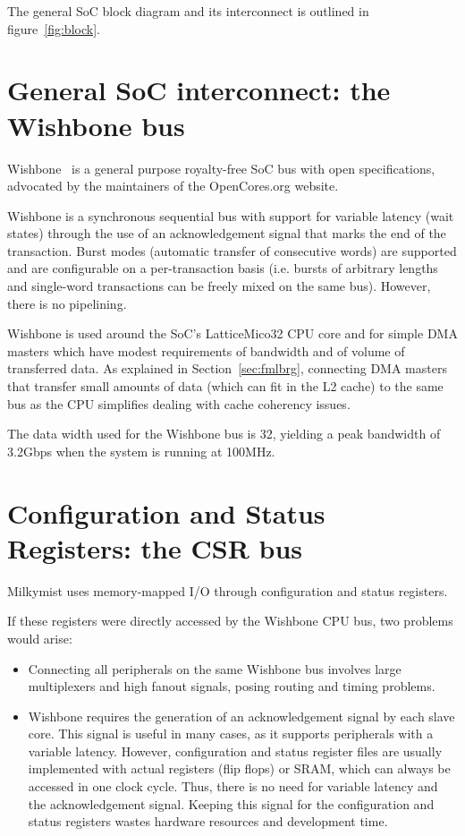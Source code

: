 \documentclass[a4paper,11pt]{kthesis}
\begin{document}
The general SoC block diagram and its interconnect is outlined in figure~\ref{fig:block}.

\section{General SoC interconnect: the Wishbone bus}
Wishbone~\cite{wishbone} is a general purpose royalty-free SoC bus with open specifications, advocated by the maintainers of the OpenCores.org website.

Wishbone is a synchronous sequential bus with support for variable latency (wait states) through the use of an acknowledgement signal that marks the end of the transaction. Burst modes (automatic transfer of consecutive words) are supported and are configurable on a per-transaction basis (i.e. bursts of arbitrary lengths and single-word transactions can be freely mixed on the same bus). However, there is no pipelining.

Wishbone is used around the SoC's LatticeMico32 CPU core and for simple DMA masters which have modest requirements of bandwidth and of volume of transferred data. As explained in Section~\ref{sec:fmlbrg}, connecting DMA masters that transfer small amounts of data (which can fit in the L2 cache) to the same bus as the CPU simplifies dealing with cache coherency issues.

The data width used for the Wishbone bus is 32, yielding a peak bandwidth of 3.2Gbps when the system is running at 100MHz.

\section{Configuration and Status Registers: the CSR bus}
Milkymist uses memory-mapped I/O through configuration and status registers.

If these registers were directly accessed by the Wishbone CPU bus, two problems would arise:
\begin{itemize}
\item Connecting all peripherals on the same Wishbone bus involves large multiplexers and high fanout signals, posing routing and timing problems.
\item Wishbone requires the generation of an acknowledgement signal by each slave core. This signal is useful in many cases, as it supports peripherals with a variable latency. However, configuration and status register files are usually implemented with actual registers (flip flops) or SRAM, which can always be accessed in one clock cycle. Thus, there is no need for variable latency and the acknowledgement signal. Keeping this signal for the configuration and status registers wastes hardware resources and development time.
\end{itemize}
\end{document}
